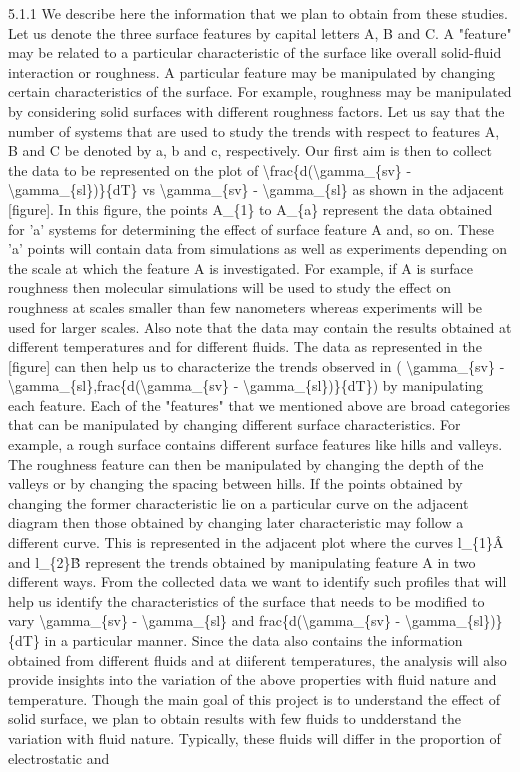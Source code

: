 \par 5.1.1 We describe here the information that we plan to obtain from these studies. Let us denote the three surface features by capital letters A, B and C. A "feature" may be related to a particular characteristic of the surface like overall solid-fluid interaction or roughness. A particular feature may be manipulated by changing certain characteristics of the surface. For example, roughness may be manipulated by considering solid surfaces with different roughness factors. Let us say that the number of systems that are used to study the trends with respect to features A, B and C be denoted by a, b and c, respectively. Our first aim is then to collect the data to be represented on the plot of \textbackslash frac\{d(\textbackslash gamma\_\{sv\} - \textbackslash gamma\_\{sl\})\}\{dT\} vs \textbackslash gamma\_\{sv\} - \textbackslash gamma\_\{sl\} as shown in the adjacent [figure]. In this figure, the points A\_\{1\} to A\_\{a\} represent the data obtained for 'a' systems for determining the effect of surface feature A and, so on. These 'a' points will contain data from simulations as well as experiments depending on the scale at which the feature A is investigated. For example, if A is surface roughness then molecular simulations will be used to study the effect on roughness at scales smaller than few nanometers whereas experiments will be used for larger scales. Also note that the data may contain the results obtained at different temperatures and for different fluids. The data as represented in the [figure] can then help us to characterize the trends observed in  ( \textbackslash gamma\_\{sv\} - \textbackslash gamma\_\{sl\},frac\{d(\textbackslash gamma\_\{sv\} - \textbackslash gamma\_\{sl\})\}\{dT\}) by manipulating each feature. Each of the "features" that we mentioned above are broad categories that can be manipulated by changing different surface characteristics. For example, a rough surface contains  different surface features like hills and valleys. The roughness feature can then be manipulated by changing the depth of the valleys or by changing the spacing between hills. If the points obtained by changing the former characteristic lie on a particular curve on the adjacent diagram then those obtained by changing later characteristic may follow a different curve. This is represented in the adjacent plot where the curves l\_\{1\}\^A and l\_\{2\}\^B represent the trends obtained by manipulating feature A in two different ways. From the collected data we want to identify such profiles that will help us identify the characteristics of the surface that needs to be modified to vary  \textbackslash gamma\_\{sv\} - \textbackslash gamma\_\{sl\} and frac\{d(\textbackslash gamma\_\{sv\} - \textbackslash gamma\_\{sl\})\}\{dT\} in a particular manner. Since the data also contains the information obtained from different fluids and at diiferent temperatures, the analysis will also provide insights into the variation of the above properties with fluid nature and temperature. Though the main goal of this project is to understand the effect of solid surface, we plan to obtain results with few fluids to undderstand the variation with fluid nature. Typically, these fluids will differ in the proportion of electrostatic and 